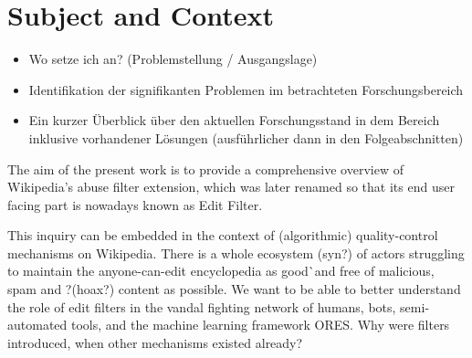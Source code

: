 \begin{comment}
Don't make it a separate subsection, but use it to introduce the topic with a story, the way Geiger does.
If the genesis doesn't make sense here, move it to Edit filters

Nice quote:
The Wikipedia Revolution: How A Bunch of Nobodies Created The World's Greatest Encyclopedia is a 2009 popular history book by new media researcher and writer Andrew Lih.

\cite{Tkacz2014}
"As historical artifacts, encyclopedias have regularly offered great insight into the periods in which they were written. They tell us about what constitutes knowledge at a particular time as well as how the various bodies of knowledge were thought to relate to one another." (p.4)
\end{comment}

\section{Subject and Context}
\begin{itemize}
	\item Wo setze ich an? (Problemstellung / Ausgangslage)
	\item Identifikation der signifikanten Problemen im betrachteten Forschungsbereich
	\item Ein kurzer Überblick über den aktuellen Forschungsstand in dem Bereich inklusive vorhandener Lösungen (ausführlicher dann in den Folgeabschnitten)
\end{itemize}

The aim of the present work is to provide a comprehensive overview of Wikipedia's abuse filter extension, which was later renamed so that its end user facing part is nowadays known as Edit Filter.


This inquiry can be embedded in the context of (algorithmic) quality-control mechanisms on Wikipedia.
There is a whole ecosystem (syn?) of actors struggling to maintain the anyone-can-edit encyclopedia as good^^ and free of malicious, spam and ?(hoax?) content as possible.
We want to be able to better understand the role of edit filters in the vandal fighting network of humans, bots, semi-automated tools, and the machine learning framework ORES.
Why were filters introduced, when other mechanisms existed already?

